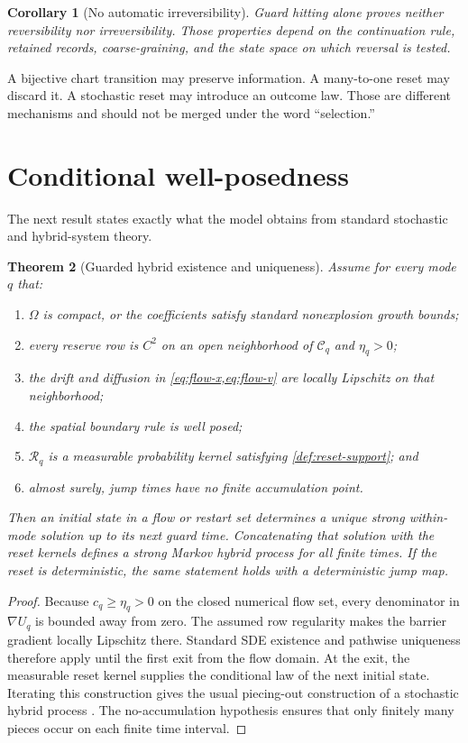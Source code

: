 \documentclass[11pt]{article}
\newtheorem{theorem}{Theorem}[section]
\newtheorem{corollary}[theorem]{Corollary}
\theoremstyle{definition}
\theoremstyle{remark}
\newcommand{\cC}{\mathcal C}
\newcommand{\cR}{\mathcal R}
\newcommand{\grad}{\nabla}
\begin{document}
\begin{corollary}[No automatic irreversibility]
\label{cor:no-irreversibility}
Guard hitting alone proves neither reversibility nor irreversibility.
Those properties depend on the continuation rule, retained records,
coarse-graining, and the state space on which reversal is tested.
\end{corollary}

A bijective chart transition may preserve information.  A many-to-one
reset may discard it.  A stochastic reset may introduce an outcome law.
Those are different mechanisms and should not be merged under the word
``selection.''

\section{Conditional well-posedness}
\label{sec:wellposed}

The next result states exactly what the model obtains from standard
stochastic and hybrid-system theory.

\begin{theorem}[Guarded hybrid existence and uniqueness]
\label{thm:wellposed}
Assume for every mode $q$ that:
\begin{enumerate}[leftmargin=2em]
\item $\Omega$ is compact, or the coefficients satisfy standard
      nonexplosion growth bounds;
\item every reserve row is $C^2$ on an open neighborhood of
      $\cC_q$ and $\eta_q>0$;
\item the drift and diffusion in \cref{eq:flow-x,eq:flow-v} are locally
      Lipschitz on that neighborhood;
\item the spatial boundary rule is well posed;
\item $\cR_q$ is a measurable probability kernel satisfying
      \cref{def:reset-support}; and
\item almost surely, jump times have no finite accumulation point.
\end{enumerate}
Then an initial state in a flow or restart set determines a unique strong
within-mode solution up to its next guard time.  Concatenating that solution
with the reset kernels defines a strong Markov hybrid process for all finite
times.  If the reset is deterministic, the same statement holds with a
deterministic jump map.
\end{theorem}

\begin{proof}
Because $c_q\ge\eta_q>0$ on the closed numerical flow set, every denominator
in $\grad U_q$ is bounded away from zero.  The assumed row regularity makes
the barrier gradient locally Lipschitz there.  Standard SDE existence and
pathwise uniqueness therefore apply until the first exit from the flow
domain.  At the exit, the measurable reset kernel supplies the conditional
law of the next initial state.  Iterating this construction gives the usual
piecing-out construction of a stochastic hybrid process
\cite{HuLygerosSastry2000}.  The no-accumulation hypothesis ensures that
only finitely many pieces occur on each finite time interval.
\end{proof}
\end{document}
